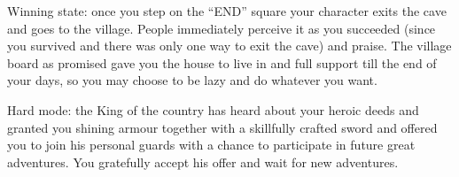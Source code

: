\documentclass[landscape]{article}
\begin{document}
Winning state: once you step on the ``END'' square your character exits the cave
and goes to the village. People immediately perceive it as you succeeded (since
you survived and there was only one way to exit the cave) and praise. The
village board as promised gave you the house to live in and full support till
the end of your days, so you may choose to be lazy and do whatever you want.

Hard mode: the King of the country has heard about your heroic deeds and
granted you shining armour together with a skillfully crafted sword and offered
you to join his personal guards with a chance to participate in future great
adventures. You gratefully accept his offer and wait for new adventures.
\end{document}
